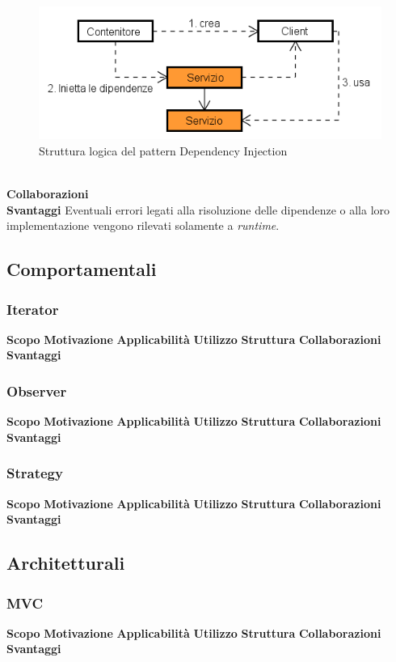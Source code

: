 \label{Struttura logica del pattern Dependency Injection}
\begin{figure}
	\centering
	\includegraphics[scale=0.45]{UML/Package/strutturaPattern/DependencyInjection.png}
	\caption{Struttura logica del pattern Dependency Injection}
\end{figure}
\\
\textbf{Collaborazioni}
\\
\textbf{Svantaggi}	Eventuali errori legati alla risoluzione delle dipendenze o alla loro implementazione vengono rilevati solamente a \textit{runtime}.


\subsection{Comportamentali}
\subsubsection{Iterator}
\textbf{Scopo}
\textbf{Motivazione}
\textbf{Applicabilità}
\textbf{Utilizzo}
\textbf{Struttura}
\textbf{Collaborazioni}
\textbf{Svantaggi}
\subsubsection{Observer}
\textbf{Scopo}
\textbf{Motivazione}
\textbf{Applicabilità}
\textbf{Utilizzo}
\textbf{Struttura}
\textbf{Collaborazioni}
\textbf{Svantaggi}
\subsubsection{Strategy}
\textbf{Scopo}
\textbf{Motivazione}
\textbf{Applicabilità}
\textbf{Utilizzo}
\textbf{Struttura}
\textbf{Collaborazioni}
\textbf{Svantaggi}

\subsection{Architetturali}
\subsubsection{MVC}
\textbf{Scopo}
\textbf{Motivazione}
\textbf{Applicabilità}
\textbf{Utilizzo}
\textbf{Struttura}
\textbf{Collaborazioni}
\textbf{Svantaggi}
